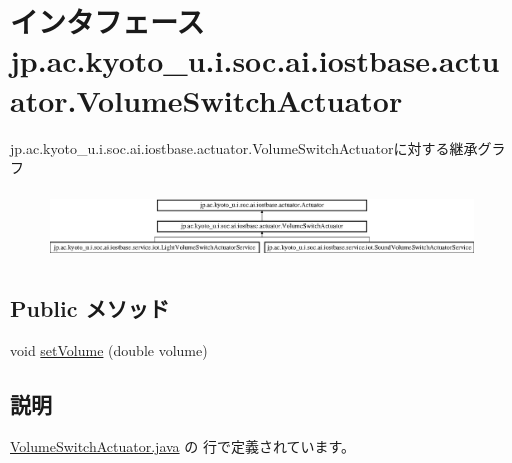 \hypertarget{interfacejp_1_1ac_1_1kyoto__u_1_1i_1_1soc_1_1ai_1_1iostbase_1_1actuator_1_1_volume_switch_actuator}{\section{インタフェース jp.\-ac.\-kyoto\-\_\-u.\-i.\-soc.\-ai.\-iostbase.\-actuator.\-Volume\-Switch\-Actuator}
\label{interfacejp_1_1ac_1_1kyoto__u_1_1i_1_1soc_1_1ai_1_1iostbase_1_1actuator_1_1_volume_switch_actuator}
}
jp.\-ac.\-kyoto\-\_\-u.\-i.\-soc.\-ai.\-iostbase.\-actuator.\-Volume\-Switch\-Actuatorに対する継承グラフ\begin{figure}[H]
\begin{center}
\leavevmode
\includegraphics[height=1.806452cm]{interfacejp_1_1ac_1_1kyoto__u_1_1i_1_1soc_1_1ai_1_1iostbase_1_1actuator_1_1_volume_switch_actuator}
\end{center}
\end{figure}
\subsection*{Public メソッド}
\begin{DoxyCompactItemize}
\item 
void \hyperlink{interfacejp_1_1ac_1_1kyoto__u_1_1i_1_1soc_1_1ai_1_1iostbase_1_1actuator_1_1_volume_switch_actuator_ab31aa1743348eb4d3cbc2844f9a17ae2}{set\-Volume} (double volume)
\end{DoxyCompactItemize}


\subsection{説明}


 \hyperlink{_volume_switch_actuator_8java_source}{Volume\-Switch\-Actuator.\-java} の  行で定義されています。




